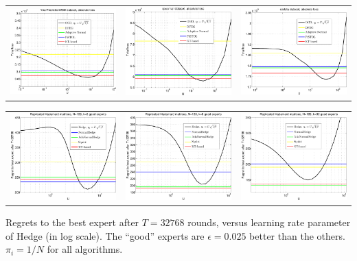\documentclass[30pt,landscape]{sciposter}
\begin{document}
\begin{multicols}{3}
\begin{tabular}{ccc}
\includegraphics[width=0.30\linewidth]{../NIPS-2016-camera-ready/figs/yearpredictionmsd_kt-crop.pdf} &
\includegraphics[width=0.30\linewidth]{../NIPS-2016-camera-ready/figs/cpusmall_kt-crop.pdf} &
\includegraphics[width=0.30\linewidth]{../NIPS-2016-camera-ready/figs/cadata_kt-crop.pdf}
\end{tabular}

\begin{tabular}{ccc}
\includegraphics[width=0.30\linewidth]{../NIPS-2016-camera-ready/figs/fig1-crop.pdf} &
\includegraphics[width=0.30\linewidth]{../NIPS-2016-camera-ready/figs/fig2-crop.pdf} & 
\includegraphics[width=0.30\linewidth]{../NIPS-2016-camera-ready/figs/fig3-crop.pdf}
\end{tabular}

\footnotesize{Regrets to the best expert after $T = 32768$ rounds,
versus learning rate parameter of Hedge (in log scale). The ``good'' experts
are $\epsilon=0.025$ better than the others. $\pi_i=1/N$ for all
algorithms.}

\end{multicols}
\end{document}
